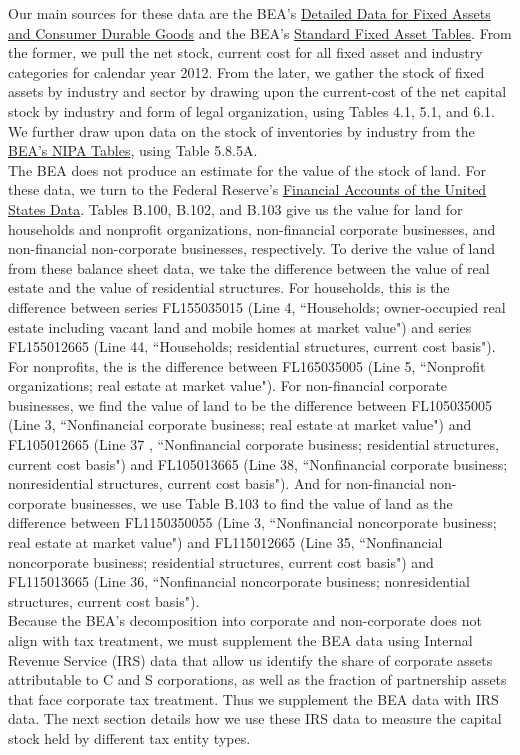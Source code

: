 \documentclass[article,11pt,letterpaper,fleqn]{article}
\theoremstyle{definition}
\numberwithin{equation}{section}
\begin{document}
Our main sources for these data are the BEA's \href{http://www.bea.gov/national/FA2004/Details/Index.html}{Detailed Data for Fixed Assets and Consumer Durable Goods} and the BEA's \href{(http://www.bea.gov/iTable/index_FA.cfm}{Standard Fixed Asset Tables}.  From the former, we pull the net stock, current cost for all fixed asset and industry categories for calendar year 2012.  From the later, we gather the stock of fixed assets by industry and sector by drawing upon the current-cost of the net capital stock by industry and form of legal organization, using Tables 4.1, 5.1, and 6.1.  We further draw upon data on the stock of inventories by industry from the \href{http://www.bea.gov/iTable/index_nipa.cfm}{BEA's NIPA Tables}, using Table 5.8.5A.  
\ \\
The BEA does not produce an estimate for the value of the stock of land.  For these data, we turn to the Federal Reserve's \href{http://www.federalreserve.gov/apps/fof/FOFTables.aspx}{Financial Accounts of the United States Data}.  Tables B.100, B.102, and B.103 give us the value for land for households and nonprofit organizations, non-financial corporate businesses, and non-financial non-corporate businesses, respectively.   To derive the value of land from these balance sheet data, we take the difference between the value of real estate and the value of residential structures.  For households, this is the difference between series FL155035015 (Line 4, ``Households; owner-occupied real estate including vacant land and mobile homes at market value") and series FL155012665 (Line 44, ``Households; residential structures, current cost basis"). For nonprofits, the is the difference between FL165035005 (Line 5, ``Nonprofit organizations; real estate at market value").  For non-financial corporate businesses, we find the value of land to be the difference between FL105035005 (Line 3, ``Nonfinancial corporate business; real estate at market value") and FL105012665 (Line 37 , ``Nonfinancial corporate business; residential structures, current cost basis") and FL105013665 (Line 38, ``Nonfinancial corporate business; nonresidential structures, current cost basis").  And for non-financial non-corporate businesses, we use Table B.103 to find the value of land as the difference between FL1150350055 (Line 3, ``Nonfinancial noncorporate business; real estate at market value") and FL115012665 (Line 35, ``Nonfinancial noncorporate business; residential structures, current cost basis") and FL115013665 (Line 36, ``Nonfinancial noncorporate business; nonresidential structures, current cost basis").
\ \\
Because the BEA's decomposition into corporate and non-corporate does not align with tax treatment, we must supplement the BEA data using Internal Revenue Service (IRS) data that allow us identify the share of corporate assets attributable to C and S corporations, as well as the fraction of partnership assets that face corporate tax treatment.  Thus we supplement the BEA data with IRS data.  The next section details how we use these IRS data to measure the capital stock held by different tax entity types.
\end{document}
